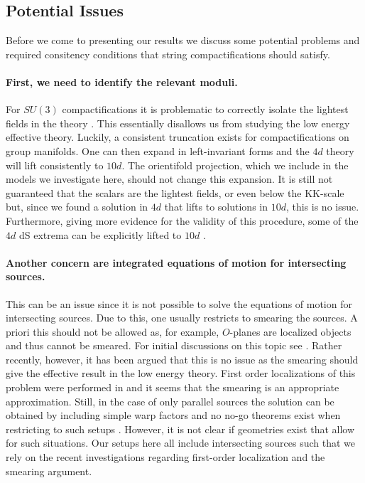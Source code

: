 \documentclass[a4paper,12pt]{report}
\begin{document}
\subsection{Potential Issues}
\label{sec:stringrequ}
Before we come to presenting our results we discuss some potential problems and required consitency conditions that string compactifications should satisfy.
\paragraph{First, we need to identify the relevant moduli.} For $SU(3)$ compactifications it is problematic to correctly isolate the lightest fields in the theory \cite{Kashani-Poor:2006ofe,Kashani-Poor:2007nby}. This essentially disallows us from studying the low energy effective theory. Luckily, a consistent truncation exists \cite{Cassani:2009ck} for compactifications on group manifolds. One can then expand in left-invariant forms and the $4d$ theory will lift consistently to $10d$. The orientifold projection, which we include in the models we investigate here, should not change this expansion. It is still not guaranteed that the scalars are the lightest fields, or even below the KK-scale \cite{Andriot:2018wzk} but, since we found a solution in $4d$ that lifts to solutions in $10d$, this is no issue. Furthermore, giving more evidence for the validity of this procedure, some of the $4d$ dS extrema can be explicitly lifted to $10d$ \cite{Danielsson:2010bc}.
\paragraph{Another concern are integrated equations of motion for intersecting sources.} This can be an issue since it is not possible to solve the equations of motion for intersecting sources. Due to this, one usually restricts to smearing the sources. A priori this should not be allowed as, for example, $O$-planes are localized objects and thus cannot be smeared. For initial discussions on this topic see \cite{Douglas:2010rt,Blaback:2010sj,Blaback:2011nz,Blaback:2011pn,Saracco:2012wc,McOrist:2012yc}. Rather recently, however, it has been argued that this is no issue as the smearing should give the effective result in the low energy theory. First order localizations of this problem were performed in \cite{Baines:2020dmu,Junghans:2020acz,Marchesano:2020qvg,Cribiori:2021djm} and it seems that the smearing is an appropriate approximation. Still, in the case of only parallel sources the solution can be obtained by including simple warp factors and no no-go theorems exist when restricting to such setups \cite{Andriot:2016xvq}. However, it is not clear if geometries exist that allow for such situations. Our setups here all include intersecting sources such that we rely on the recent investigations regarding first-order localization and the smearing argument. 
\end{document}
